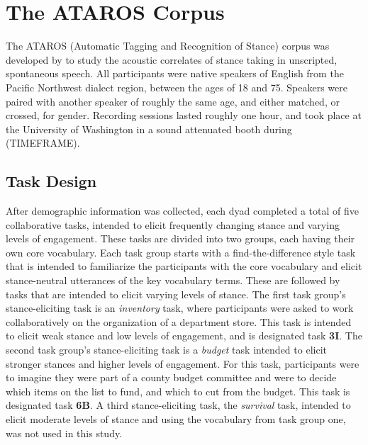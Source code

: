 \section{The ATAROS Corpus} 

The ATAROS (Automatic Tagging and Recognition of Stance) corpus was developed by \cite{freeman2014ataros} to study the acoustic correlates of stance taking in unscripted, spontaneous speech.  All participants were native speakers of English from the Pacific Northwest dialect region, between the ages of 18 and 75.  Speakers were paired with another speaker of roughly the same age, and either matched, or crossed, for gender.  Recording sessions lasted roughly one hour, and took place at the University of Washington in a sound attenuated booth during (TIMEFRAME).  

\subsection{Task Design} 
\label{subsec:task_design} 

After demographic information was collected, each dyad completed a total of five collaborative tasks, intended to elicit frequently changing stance and varying levels of engagement.  These tasks are divided into two groups, each having their own core vocabulary.  Each task group starts with a find-the-difference style task that is intended to familiarize the participants with the core vocabulary and elicit stance-neutral utterances of the key vocabulary terms.  These are followed by tasks that are intended to elicit varying levels of stance.  The first task group's stance-eliciting task is an \emph{inventory} task, where participants were asked to work collaboratively on the organization of a department store.  This task is intended to elicit weak stance and low levels of engagement, and is designated task \textbf{3I}. The second task group's stance-eliciting task is a \emph{budget} task intended to elicit stronger stances and higher levels of engagement.  For this task, participants were to imagine they were part of a county budget committee and were to decide which items on the list to fund, and which to cut from the budget.  This task is designated task \textbf{6B}.  A third stance-eliciting task, the \emph{survival} task, intended to elicit moderate levels of stance and using the vocabulary from task group one, was not used in this study. 


